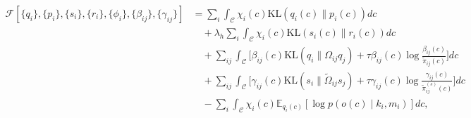 \documentclass[11pt]{article}
\begin{document}
\begin{equation}
\boxed{
\begin{aligned}
\mathcal{F}[\{q_i\}, \{p_i\}, \{s_i\}, \{r_i\}, \{\phi_i\}, \{\beta_{ij}\}, \{\gamma_{ij}\}]
&= \sum_i \int_{\mathcal{C}} \chi_i(c)  \mathrm{KL}(q_i(c) \| p_i(c))  dc \\
&\quad + \lambda_h \sum_i \int_{\mathcal{C}} \chi_i(c)  \mathrm{KL}(s_i(c) \| r_i(c))  dc \\
&\quad + \sum_{ij} \int_{\mathcal{C}} \Big[\beta_{ij}(c)  \mathrm{KL}(q_i \| \Omega_{ij} q_j) + \tau \beta_{ij}(c) \log\tfrac{\beta_{ij}(c)}{\tilde{\pi}_{ij}(c)}\Big] dc \\
&\quad + \sum_{ij} \int_{\mathcal{C}} \Big[\gamma_{ij}(c)  \mathrm{KL}(s_i \| \tilde{\Omega}_{ij} s_j) + \tau \gamma_{ij}(c) \log\tfrac{\gamma_{ij}(c)}{\tilde{\pi}^{(s)}_{ij}(c)}\Big] dc \\
&\quad - \sum_i \int_{\mathcal{C}} \chi_i(c)  \mathbb{E}_{q_i(c)}[\log p(o(c) \mid k_i, m_i)]  dc,
\end{aligned}
}
\label{eq:free_energy_functional_final}
\end{equation}
\end{document}
